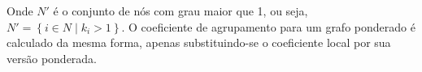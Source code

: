 \documentclass[12pt,a4paper]{article}
\begin{document}
Onde $N'$ é o conjunto de nós com grau maior que 1, ou seja, $N' = \left\lbrace i \in N \mid k_i > 1 \right\rbrace$. O coeficiente de agrupamento para um grafo ponderado é calculado da mesma forma, apenas substituindo-se o coeficiente local por sua versão ponderada.

\end{document}
